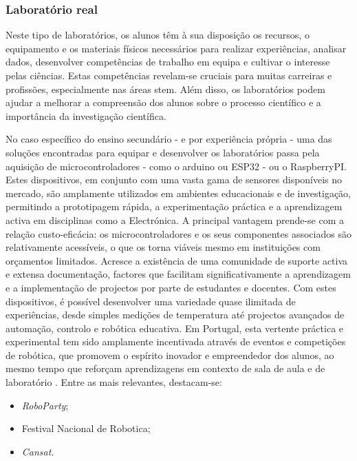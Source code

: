\subsubsection{Laboratório real}
Neste tipo de laboratórios, os alunos têm à sua disposição os recursos, o equipamento e os materiais físicos necessários para realizar experiências, analisar dados, desenvolver competências de trabalho em equipa e cultivar o interesse pelas ciências. Estas competências revelam-se cruciais para muitas carreiras e profissões, especialmente nas áreas \acrshort{stem}. Além disso, os laboratórios podem ajudar a melhorar a compreensão dos alunos sobre o processo científico e a importância da investigação científica.

No caso específico do ensino secundário - e por experiência própria - uma das soluções encontradas para equipar e desenvolver os laboratórios passa pela aquisição de microcontroladores - como o \gls{arduino} ou \gls{ESP32} - ou o \gls{RaspberryPI}. Estes dispositivos, em conjunto com uma vasta gama de sensores disponíveis no mercado, são amplamente utilizados em ambientes educacionais e de investigação, permitindo a prototipagem rápida, a experimentação práctica e a aprendizagem activa em disciplinas como a Electrónica. A principal vantagem prende-se com a relação custo-eficácia: os microcontroladores e os seus componentes associados são relativamente acessíveis, o que os torna viáveis mesmo em instituições com orçamentos limitados. Acresce a existência de uma comunidade de suporte activa e extensa documentação, factores que facilitam significativamente a aprendizagem e a implementação de projectos por parte de estudantes e docentes. Com estes dispositivos, é possível desenvolver uma variedade quase ilimitada de experiências, desde simples medições de temperatura até projectos avançados de automação, controlo e robótica educativa.
Em Portugal, esta vertente práctica e experimental tem sido amplamente incentivada através de eventos e competições de robótica, que promovem o espírito inovador e empreendedor dos alunos, ao mesmo tempo que reforçam aprendizagens em contexto de sala de aula e de laboratório \cite{roboparty, fnr, cansat}. Entre as mais relevantes, destacam-se:
\begin{itemize}
    \item \textit{RoboParty};
    \item Festival Nacional de Robotica;
    \item \textit{Cansat}.
\end{itemize}


